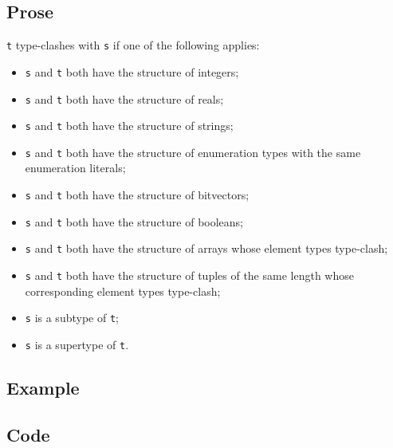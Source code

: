 \documentclass{book}
\begin{document}
  \subsection{Prose}
  \texttt{t} type-clashes with \texttt{s} if one of the following applies:
  \begin{itemize}
  \item \texttt{s} and \texttt{t} both have the structure of integers;
  \item \texttt{s} and \texttt{t} both have the structure of reals;
  \item \texttt{s} and \texttt{t} both have the structure of strings;
  \item \texttt{s} and \texttt{t} both have the structure of enumeration types with the same enumeration literals;
  \item \texttt{s} and \texttt{t} both have the structure of bitvectors;
  \item \texttt{s} and \texttt{t} both have the structure of booleans;
  \item \texttt{s} and \texttt{t} both have the structure of arrays whose element types type-clash;
  \item \texttt{s} and \texttt{t} both have the structure of tuples of the same length whose
    corresponding element types type-clash;
  \item \texttt{s} is a subtype of \texttt{t};
  \item \texttt{s} is a supertype of \texttt{t}.
  \end{itemize}

  \subsection{Example}

  \subsection{Code}
\end{document}
